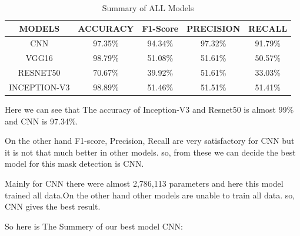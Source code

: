 \documentclass[conference]{IEEEtran}
\begin{document}
\begin{table}[htbp]
\caption{Summary of ALL Models}
\label{tab:summary}
\begin{tabular}{|c|c|c|c|c|}
\hline
\textbf{MODELS}             & \textbf{ACCURACY} & \textbf{F1-Score}    & \textbf{PRECISION} & \textbf{RECALL}                  \\ \hline
CNN                         &  97.35\% &            94.34\%            &      97.32\%               &      91.79\%              \\ \hline
VGG16  &  98.79\%   & 51.08\%  & 51.61\%  & 50.57\% \\ \hline
RESNET50     & 70.67\%   & 39.92\%    & 51.61\%   &  33.03\%  \\ \hline
INCEPTION-V3  & 98.89\%   & 51.46\%  & 51.51\%   & 51.41\%  \\ \hline

\end{tabular}
\end{table}

Here we can see that The accuracy of Inception-V3 and Resnet50 is almost 99\% and CNN is 97.34\%.

On the other hand F1-score, Precision, Recall are very satisfactory for CNN but it is not that much better in other models. so, from these we can decide the best model for this mask detection is CNN.

Mainly for CNN there were almost 2,786,113 parameters and here this model trained all data.On the other hand other models are unable to train all data. so, CNN gives the best result.

\newpage
So here is The Summery of our best model CNN: 
\end{document}

